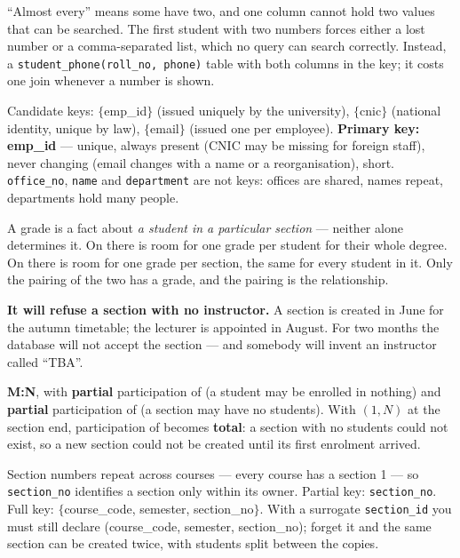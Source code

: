 \begin{ans}
  \item ``Almost every'' means some have two, and one column cannot hold two
        values that can be searched. The first student with two numbers forces
        either a lost number or a comma-separated list, which no query can
        search correctly. Instead, a \texttt{student\_phone(roll\_no, phone)}
        table with both columns in the key; it costs one join whenever a
        number is shown.
  \item Candidate keys: $\{$emp\_id$\}$ (issued uniquely by the university),
        $\{$cnic$\}$ (national identity, unique by law), $\{$email$\}$ (issued
        one per employee). \textbf{Primary key: emp\_id} --- unique, always
        present (CNIC may be missing for foreign staff), never changing (email
        changes with a name or a reorganisation), short. \texttt{office\_no},
        \texttt{name} and \texttt{department} are not keys: offices are
        shared, names repeat, departments hold many people.
  \item A grade is a fact about \emph{a student in a particular section} ---
        neither alone determines it. On  there is room for one
        grade per student for their whole degree. On  there is
        room for one grade per section, the same for every student in it. Only
        the pairing of the two has a grade, and the pairing is the
        relationship.
\end{ans}

\begin{ans}
  \item \textbf{It will refuse a section with no instructor.} A section is
        created in June for the autumn timetable; the lecturer is appointed in
        August. For two months the database will not accept the section ---
        and somebody will invent an instructor called ``TBA''.
  \item \textbf{M:N}, with \textbf{partial} participation of 
        (a student may be enrolled in nothing) and \textbf{partial}
        participation of  (a section may have no students). With
        $(1,N)$ at the section end, participation of  becomes
        \textbf{total}: a section with no students could not exist, so a new
        section could not be created until its first enrolment arrived.
  \item Section numbers repeat across courses --- every course has a section
        1 --- so \texttt{section\_no} identifies a section only within its
        owner. Partial key: \texttt{section\_no}. Full key: $\{$course\_code,
        semester, section\_no$\}$. With a surrogate \texttt{section\_id} you
        must still declare  (course\_code, semester,
        section\_no); forget it and the same section can be created twice,
        with students split between the copies.
\end{ans}

